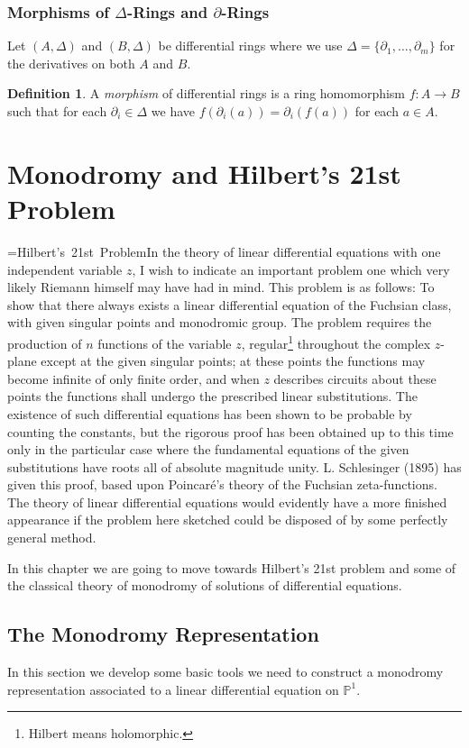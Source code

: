 \documentclass[12pt]{book}
\numberwithin{equation}{section}
\theoremstyle{definition}
\newtheorem{definition}[theorem]{Definition}
\theoremstyle{remark}
\newcommand{\PP}{\mathbb{P}}
\def\quoteattr#1#2{\setbox0=\hbox{#2}#1\tabto{\dimexpr\linewidth-\wd0}\box0}
\begin{document}
\subsection{Morphisms of $\Delta$-Rings and $\partial$-Rings}
Let $(A,\Delta)$ and $(B,\Delta)$ be differential rings where we use $\Delta = \lbrace \partial_1,\ldots,\partial_m\rbrace$ for the derivatives on both $A$ and $B$.
\begin{definition}
A \emph{morphism} of differential rings is a ring homomorphism $f:A\to B$ such that for each $\partial_i \in \Delta$ we have $f(\partial_i(a)) = \partial_i(f(a))$ for each $a\in A$. 
\end{definition}

\chapter{Monodromy and Hilbert's 21st Problem }

\quoteattr{In the theory of linear differential equations with one independent variable $z$, I wish to indicate an important problem one which very likely Riemann himself may have had in mind. 
	This problem is as follows: To show that there always exists a linear differential equation of the Fuchsian class, with given singular points and monodromic group. 
	The problem requires the production of $n$ functions of the variable $z$, regular\footnote{Hilbert means holomorphic.} throughout the complex $z$-plane except at the given singular points; at these points the functions may become infinite of only finite order, and when $z$ describes circuits about these points the functions shall undergo the prescribed linear substitutions. 
	The existence of such differential equations has been shown to be probable by counting the constants, but the rigorous proof has been obtained up to this time only in the particular case where the fundamental equations of the given substitutions have roots all of absolute magnitude unity. L. Schlesinger (1895) has given this proof, based upon Poincaré's theory of the Fuchsian zeta-functions. 
	The theory of linear differential equations would evidently have a more finished appearance if the problem here sketched could be disposed of by some perfectly general method.}{Hilbert's 21st Problem}

In this chapter we are going to move towards Hilbert's 21st problem and some of the classical theory of monodromy of solutions of differential equations.


\section{The Monodromy Representation}
In this section we develop some basic tools we need to construct a monodromy representation associated to a linear differential equation on $\PP^1$.
\end{document}
